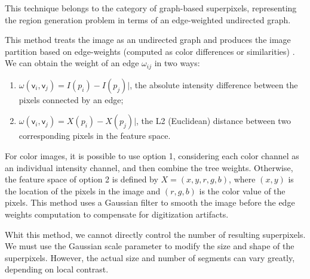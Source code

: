 This technique belongs to the category of graph-based superpixels, representing the region generation problem in terms of an edge-weighted undirected graph.

This method treats the image as an undirected graph and produces the image partition based on edge-weights (computed as color differences or similarities) \citep{Felzenszwalb.Huttenlocher:IJCV:2004}. We can obtain the weight of an edge $\omega_{ij}$
in two ways:
\begin{enumerate}
	\item $\omega(\mathsf{v}_i, \mathsf{v}_j)= I(p_i) - I(p_j)|$, the absolute intensity difference between the pixels connected by an edge; 
	\item $\omega(\mathsf{v}_i, \mathsf{v}_j)= X(p_i) - X(p_j)|$, the L2 (Euclidean) distance between two corresponding pixels in the feature space.
\end{enumerate}

For color images, it is possible to use option 1, considering each color channel as an individual intensity channel, and then combine the tree weights. Otherwise, the feature space of option 2 is defined by $X = (x, y,r, g, b)$, where $(x, y)$ is the location of the pixels in the image and $(r, g, b)$ is the color value of the pixels. This method uses a Gaussian filter to smooth the image before the edge weights computation to compensate for digitization artifacts. 

Whit this method, we cannot directly control the number of resulting superpixels. We must use the Gaussian scale parameter to modify the size and shape of the superpixels. However, the actual size and number of segments can vary greatly, depending on local contrast.

